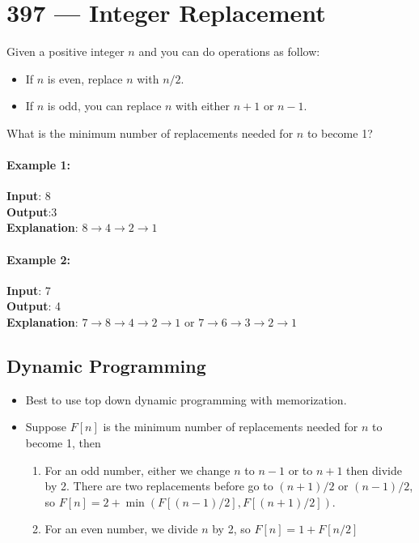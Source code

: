 \section{397 --- Integer Replacement}
Given a positive integer $ n $ and you can do operations as follow:

\begin{itemize}
\item If $ n $ is even, replace $ n $ with $ n/2 $.
\item If $ n $ is odd, you can replace $ n $ with either $ n + 1 $ or $ n - 1 $.
\end{itemize}

What is the minimum number of replacements needed for $ n $ to become 1?

\paragraph{Example 1:}

\begin{flushleft}
\textbf{Input}: 8
\\
\textbf{Output}:3
\\
\textbf{Explanation}: $8 \rightarrow 4 \rightarrow 2 \rightarrow 1$
\end{flushleft}

\paragraph{Example 2:}

\begin{flushleft}
\textbf{Input}: 7
\\
\textbf{Output}: 4
\\
\textbf{Explanation}: $7 \rightarrow 8 \rightarrow 4 \rightarrow 2 \rightarrow 1$ or 
$7 \rightarrow 6 \rightarrow 3 \rightarrow 2 \rightarrow 1$
\end{flushleft}

\subsection{Dynamic Programming}
\begin{itemize}
\item Best to use top down dynamic programming with memorization.
\item Suppose $F[n]$ is the minimum number of replacements needed for $n$ to become 1, then 
\begin{enumerate}
\item For an odd number, either we change $n$ to $n-1$ or to $n+1$ then divide by 2. There are two replacements before go to $(n+1)/2$ or $(n-1)/2$, so $F[n]=2+\min(F[(n-1)/2], F[(n+1)/2])$. 
\item For an even number, we divide $n$ by 2, so $F[n] = 1 + F[n/2]$
\end{enumerate}
\end{itemize}

